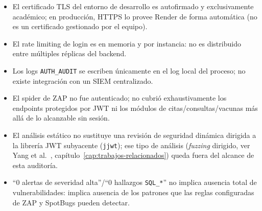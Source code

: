 \begin{itemize}[nosep]
  \item El certificado TLS del entorno de desarrollo es autofirmado y
    exclusivamente acad\'emico; en producci\'on, HTTPS lo provee Render de
    forma autom\'atica (no es un certificado gestionado por el equipo).
  \item El rate limiting de login es en memoria y por instancia: no es
    distribuido entre m\'ultiples r\'eplicas del backend.
  \item Los logs \texttt{AUTH\_AUDIT} se escriben \'unicamente en el log
    local del proceso; no existe integraci\'on con un SIEM centralizado.
  \item El spider de ZAP no fue autenticado; no cubri\'o exhaustivamente
    los endpoints protegidos por JWT ni los m\'odulos de citas/consultas/vacunas
    m\'as all\'a de lo alcanzable sin sesi\'on.
  \item El an\'alisis est\'atico no sustituye una revisi\'on de seguridad
    din\'amica dirigida a la librer\'ia JWT subyacente (\texttt{jjwt}); ese
    tipo de an\'alisis (\emph{fuzzing} dirigido, ver
    Yang et al.~\cite{yang2026tokentimebomb}, cap\'itulo~\ref{cap:trabajos-relacionados})
    queda fuera del alcance de esta auditor\'ia.
  \item ``0 alertas de severidad alta''/``0 hallazgos \texttt{SQL\_*}'' no
    implica ausencia total de vulnerabilidades: implica ausencia de los
    patrones que las reglas configuradas de ZAP y SpotBugs pueden detectar.
\end{itemize}
